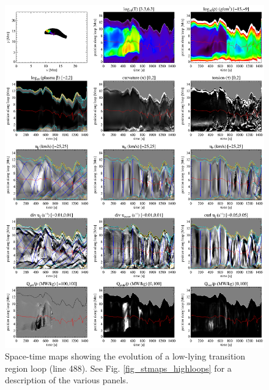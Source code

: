 \documentclass{aa}
\begin{document}
{\begin{figure}[!h]
\begin{center}
\includegraphics[width=\textwidth]{figures2/stmaps_line_488.eps}
\end{center}
\caption{Space-time maps showing the evolution of a low-lying transition region loop (line 488). See Fig. \ref{fig_stmaps_highloops} for a description of the various panels. \label{fig_stmaps_lowloops_488}}
\end{figure}

}
\end{document}
